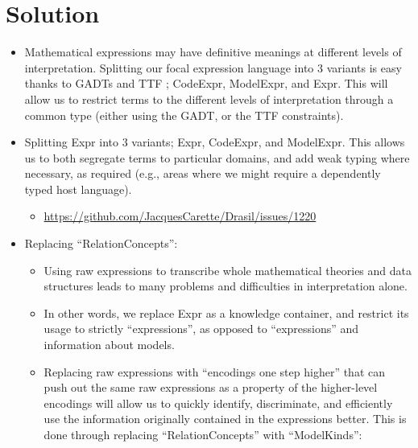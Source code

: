 \section{Solution}

\begin{itemize}

	\item Mathematical expressions may have definitive meanings at different
	      levels of interpretation. Splitting our focal expression language into
	      3 variants is easy thanks to GADTs and TTF \cite{Carette2009};
	      CodeExpr, ModelExpr, and Expr. This will allow us to restrict terms to
	      the different levels of interpretation through a common type (either
	      using the GADT, or the TTF constraints).

	\item Splitting Expr into 3 variants; Expr, CodeExpr, and ModelExpr. This
	      allows us to both segregate terms to particular domains, and add weak
	      typing where necessary, as required (e.g., areas where we might
	      require a dependently typed host language).

	      \begin{itemize}

		      \item
		            \url{https://github.com/JacquesCarette/Drasil/issues/1220}

	      \end{itemize}


	\item Replacing ``RelationConcepts'':

	      \begin{itemize}

		      \item Using raw expressions to transcribe whole mathematical
		            theories and data structures leads to many problems and
		            difficulties in interpretation alone.

		      \item In other words, we replace Expr as a knowledge container,
		            and restrict its usage to strictly ``expressions'', as
		            opposed to ``expressions'' and information about models.

		      \item Replacing raw expressions with ``encodings one step higher''
		            that can push out the same raw expressions as a property of
		            the higher-level encodings will allow us to quickly
		            identify, discriminate, and efficiently use the information
		            originally contained in the expressions better. This is done
		            through replacing ``RelationConcepts'' with ``ModelKinds'':


\end{itemize}
\end{itemize}
